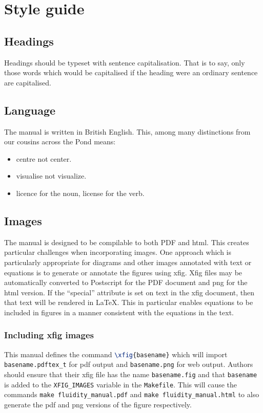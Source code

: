 \section{Style guide}

\subsection{Headings}

Headings should be typeset with sentence capitalisation. That is to say,
only those words which would be capitalised if the heading were an ordinary
sentence are capitalised.

\subsection{Language}

The manual is written in British English. This, among many distinctions from
our cousins across the Pond means:

\begin{itemize}
\item centre not center.
\item visualise not visualize.
\item licence for the noun, license for the verb.
\end{itemize}

\subsection{Images}

The manual is designed to be compilable to both PDF and html. This creates
particular challenges when incorporating images. One approach which is
particularly appropriate for diagrams and other images annotated with text
or equations is to generate or annotate the figures using xfig. Xfig files
may be automatically converted to Postscript for the PDF document and png
for the html version. If the ``special'' attribute is set on text in the
xfig document, then that text will be rendered in \LaTeX. This in particular
enables equations to be included in figures in a manner consistent with the
equations in the text.

\subsubsection{Including xfig images}

This manual defines the command \lstinline[language=TeX]+\xfig{basename}+
which will import \verb+basename.pdftex_t+ for pdf output and
\verb+basename.png+ for web output. Authors should ensure that their xfig
file has the name \verb+basename.fig+ and that \verb+basename+ is added to
the \verb+XFIG_IMAGES+ variable in the \verb+Makefile+. This will cause the
commands \verb+make fluidity_manual.pdf+ and
\verb+make fluidity_manual.html+ to also generate the pdf and png versions
of the figure respectively.

